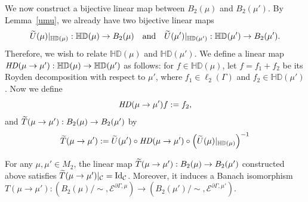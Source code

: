 \documentclass[10pt]{amsart}
\theoremstyle{definition}\newtheorem{defi}[theo]{Definition}\newtheorem{rema}[theo]{Remark}\newtheorem{exam}[theo]{Example}\newtheorem{exem}[theo]{Example}\newtheorem{nota}[theo]{Notation}
\newcommand{\ce}{\mathcal{E}}
\newcommand{\cC}{\mathcal{C}}
\newcommand{\bHD}{\mathbb{HD}}
\newcommand{\rmId}{\mathrm{Id}}
\let\oldtilde\tilde
\renewcommand*{\tilde}[1]{\mathchoice{\widetilde{#1}}{\widetilde{#1}}{\oldtilde{#1}}{\oldtilde{#1}}}
\begin{document}
We now construct a bijective linear map between $B_2(\mu)$ and $B_2(\mu')$. By Lemma~\ref{umu}, we already have two bijective linear maps 
\[
\tilde{U}(\mu)|_{\bHD(\mu)}:\bHD(\mu)\to B_2(\mu)\quad \text{and}\quad \tilde{U}(\mu')|_{\bHD(\mu')}:\bHD(\mu')\to B_2(\mu').
\]
Therefore, we wish to relate $\bHD(\mu)$ and $\bHD(\mu')$. We define a linear map ${\it HD}(\mu\rightarrow\mu'):\bHD(\mu)\rightarrow\bHD(\mu')$ as follows: for $f\in\bHD(\mu)$, let $f=f_1+f_2$ be its Royden decomposition with respect to $\mu'$, where $f_1\in\ell_2(\Gamma)$
and $f_2\in\bHD(\mu')$. Now we define
\[
{\it HD}(\mu\rightarrow\mu')f:=f_2,
\]
and $\tilde{T}(\mu\rightarrow\mu'): B_2(\mu)\to B_2(\mu')$ by
\begin{align}\label{def:tmumu}
\tilde{T}(\mu\rightarrow\mu'):=\tilde{U}(\mu')
\circ {\it HD}(\mu\rightarrow\mu')\circ \left(\tilde{U}(\mu)|_{\bHD(\mu)}\right)^{-1}
\end{align}

\begin{prop}\label{mumu}
For any $\mu,\mu'\in M_2$, the linear map $\tilde{T}(\mu\rightarrow\mu'): B_2(\mu)\to B_2(\mu')$ constructed above satisfies $\tilde{T}(\mu\to\mu')|_\cC=\rmId_\cC$. Moreover, it induces a Banach isomorphism $T(\mu\rightarrow\mu'):(B_2(\mu)/\sim,\ce^{\partial\Gamma,\mu})\rightarrow(B_2(\mu')/\sim,\ce^{\partial\Gamma,\mu'})$.
\end{prop}
\end{document}
